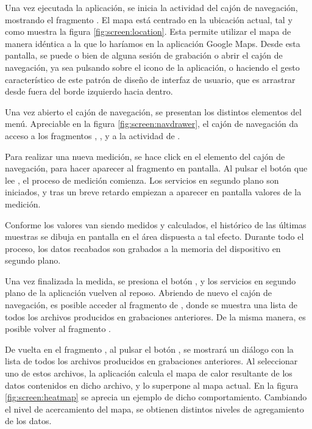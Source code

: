     Una vez ejecutada la aplicación, se inicia la actividad del cajón de navegación, mostrando el fragmento . El mapa está centrado en la ubicación actual, tal y como muestra la figura \ref{fig:screen:location}. Esta permite utilizar el mapa de manera idéntica a la que lo haríamos en la aplicación Google Maps. Desde esta pantalla, se puede o bien  de alguna sesión de grabación o abrir el cajón de navegación, ya sea pulsando sobre el icono de la aplicación, o haciendo el gesto característico de este patrón de diseño de interfaz de usuario, que es arrastrar desde fuera del borde izquierdo hacia dentro.
    
    Una vez abierto el cajón de navegación, se presentan los distintos elementos del menú. Apreciable en la figura \ref{fig:screen:navdrawer}, el cajón de navegación da acceso a los fragmentos , ,  y a la actividad de .
    
    Para realizar una nueva medición, se hace click en el elemento  del cajón de navegación, para hacer aparecer al fragmento  en pantalla. Al pulsar el botón que lee , el proceso de medición comienza. Los servicios en segundo plano son iniciados, y tras un breve retardo empiezan a aparecer en pantalla valores de la medición. 
    
    Conforme los valores van siendo medidos y calculados, el histórico de las últimas muestras se dibuja en pantalla en el área dispuesta a tal efecto. Durante todo el proceso, los datos recabados son grabados a la memoria del dispositivo en segundo plano.
    
    Una vez finalizada la medida, se presiona el botón , y los servicios en segundo plano de la aplicación vuelven al reposo. Abriendo de nuevo el cajón de navegación, es posible acceder al fragmento de , donde se muestra una lista de todos los archivos producidos en grabaciones anteriores. De la misma manera, es posible volver al fragmento .
    
    De vuelta en el fragmento , al pulsar el botón , se mostrará un diálogo con la lista de todos los archivos producidos en grabaciones anteriores. Al seleccionar uno de estos archivos, la aplicación calcula el mapa de calor resultante de los datos contenidos en dicho archivo, y lo superpone al mapa actual. En la figura \ref{fig:screen:heatmap} se aprecia un ejemplo de dicho comportamiento. Cambiando el nivel de acercamiento del mapa, se obtienen distintos niveles de agregamiento de los datos.
    
